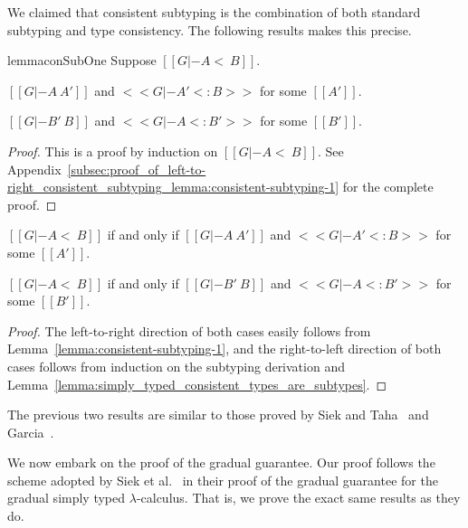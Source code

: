 We claimed that consistent subtyping is the combination of both
standard subtyping and type consistency. The following results makes
this precise.
\begin{restatable}{lemma}{conSubOne}
  \label{lemma:consistent-subtyping-1}
  Suppose $[[G |- A <~ B]]$.
  \begin{enumR}
    \item $[[G |- A ~ A']]$ and $<<G |- A' <: B>>$ for some $[[A']]$.
    \item $[[G |- B' ~ B]]$ and $<<G |- A <: B'>>$ for some $[[B']]$.
  \end{enumR}   
\end{restatable}
\begin{proof}
  This is a proof by induction on $[[G |- A <~ B]]$.  See
  Appendix~\ref{subsec:proof_of_left-to-right_consistent_subtyping_lemma:consistent-subtyping-1}
  for the complete proof.
\end{proof}
\begin{corollary}
  \label{corollary:consistent_subtyping}
  \begin{enumR}
  \item $[[G |- A <~ B]]$ if and only if $[[G |- A ~ A']]$ and $<<G |- A' <: B>>$ for some $[[A']]$.
  \item $[[G |- A <~ B]]$ if and only if $[[G |- B' ~ B]]$ and $<<G |- A <: B'>>$ for some $[[B']]$.
  \end{enumR}
\end{corollary}
\begin{proof}
  The left-to-right direction of both cases easily follows from
  Lemma~\ref{lemma:consistent-subtyping-1}, and the right-to-left
  direction of both cases follows from induction on the subtyping
  derivation and Lemma~\ref{lemma:simply_typed_consistent_types_are_subtypes}.
\end{proof}
The previous two results are similar to those proved by Siek and
Taha~\cite{Siek:2007} and Garcia~\cite{Garcia:2016}.

We now embark on the proof of the gradual guarantee.  Our proof
follows the scheme adopted by Siek et al.~\cite{Siek:2015} in their
proof of the gradual guarantee for the gradual simply typed
$\lambda$-calculus.  That is, we prove the exact same results as they
do.

